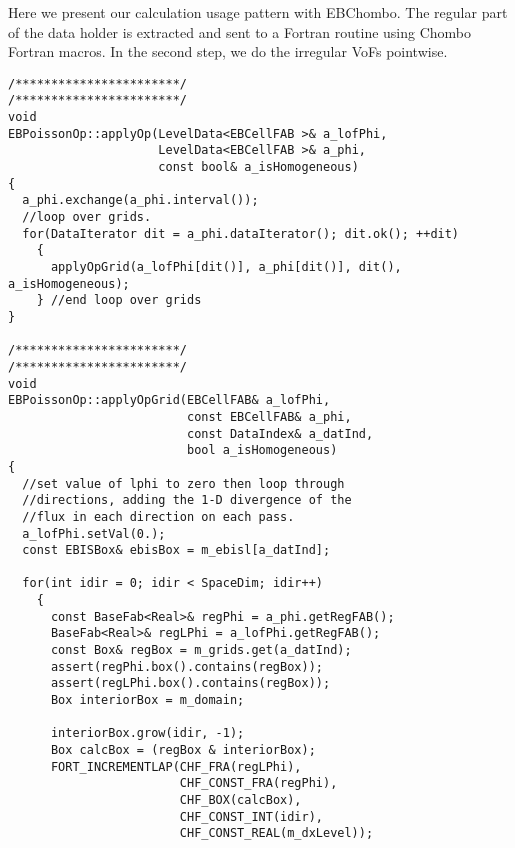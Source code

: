 Here we present our calculation usage pattern with EBChombo. 
The regular part of the data holder is extracted and 
sent to a Fortran routine using Chombo Fortran macros.
In the second step, we do the irregular VoFs pointwise.
\begin{small}
\begin{verbatim}
/***********************/
/***********************/
void
EBPoissonOp::applyOp(LevelData<EBCellFAB >& a_lofPhi, 
                     LevelData<EBCellFAB >& a_phi,
                     const bool& a_isHomogeneous)
{
  a_phi.exchange(a_phi.interval());
  //loop over grids.      
  for(DataIterator dit = a_phi.dataIterator(); dit.ok(); ++dit)
    {
      applyOpGrid(a_lofPhi[dit()], a_phi[dit()], dit(), a_isHomogeneous);
    } //end loop over grids
}

/***********************/
/***********************/
void
EBPoissonOp::applyOpGrid(EBCellFAB& a_lofPhi, 
                         const EBCellFAB& a_phi,
                         const DataIndex& a_datInd,
                         bool a_isHomogeneous)
{
  //set value of lphi to zero then loop through
  //directions, adding the 1-D divergence of the
  //flux in each direction on each pass.  
  a_lofPhi.setVal(0.);
  const EBISBox& ebisBox = m_ebisl[a_datInd];
  
  for(int idir = 0; idir < SpaceDim; idir++)
    {
      const BaseFab<Real>& regPhi = a_phi.getRegFAB();
      BaseFab<Real>& regLPhi = a_lofPhi.getRegFAB();
      const Box& regBox = m_grids.get(a_datInd);
      assert(regPhi.box().contains(regBox));
      assert(regLPhi.box().contains(regBox));
      Box interiorBox = m_domain;

      interiorBox.grow(idir, -1);
      Box calcBox = (regBox & interiorBox);
      FORT_INCREMENTLAP(CHF_FRA(regLPhi),
                        CHF_CONST_FRA(regPhi),
                        CHF_BOX(calcBox),
                        CHF_CONST_INT(idir),
                        CHF_CONST_REAL(m_dxLevel));
      


\end{verbatim}
\end{small}
